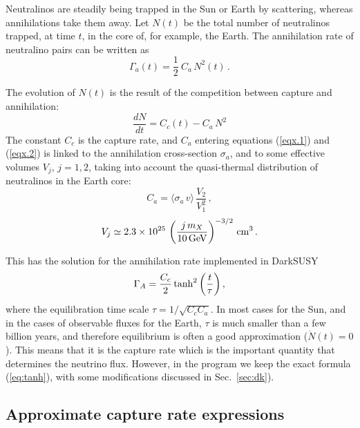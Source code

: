\documentclass[a4paper,10pt,oneside]{book}
\newcommand{\beq}{\begin{equation}}
\newcommand{\eeq}{\end{equation}}
\newcommand{\ds}{{\sffamily DarkSUSY}}
\begin{document}
Neutralinos are steadily being trapped in the Sun or Earth by
scattering, whereas annihilations take them away.
Let $N(t)$ be the total number of neutralinos trapped, at time $t$, in the core
of, for example,  the Earth.
The annihilation rate of neutralino pairs can be written as
\begin{equation}
\Gamma_a (t) = \frac{1}{2} \ C_a \, N^2 (t) \, . \label{eqx.1}
\end{equation}

The evolution of $N(t)$ is the result of the competition between capture and
annihilation:
\begin{equation}
\frac{dN}{dt} = C_c (t) - C_a \, N^2 \label{eqx.2}
\end{equation}
The constant $C_c$ is the capture rate, and
$C_a$ entering equations (\ref{eqx.1}) and (\ref{eqx.2}) is linked to
the annihilation cross-section $\sigma_a$, and to some effective volumes $V_j$,
$j=1,2$, taking into account the quasi-thermal distribution of neutralinos in
the Earth core:
\begin{equation}
C_a = \langle \sigma_a \, v \rangle \, \frac{V_2 }{ V_1^2} \, , \label{eq6.3}
\end{equation}
\begin{equation}
V_j \simeq 2.3 \times 10^{25} \, \left(\frac{j \, m_X}{ 10 \, {\rm 
GeV}}\right)^{-3/2} \, {\rm
cm}^3 \, . \label{eq6.4}
\end{equation}

This has the solution for the annihilation rate implemented in \ds\
\beq
\Gamma_A={C_c\over 2} \tanh^2\left({t\over \tau}\right),\label{eq:tanh}
\eeq
where the equilibration time scale $\tau=1/\sqrt{C_cC_a}$.  In most
cases for the Sun, and in the cases of observable fluxes for the
Earth, $\tau$ is much smaller than a few billion years, and therefore
equilibrium is often a good approximation ($\dot N(t)=0$).
This means
that it is the capture rate which is the important quantity that
determines the neutrino flux. However, in the program we keep the exact
formula (\ref{eq:tanh}), with some
modifications discussed in Sec.~\ref{sec:dk}).

\subsection{Approximate capture rate expressions}
\end{document}
